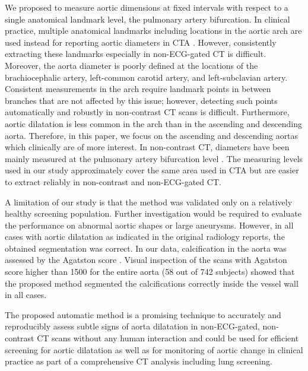 We proposed to measure aortic dimensions at fixed intervals with respect to a single anatomical landmark level, the pulmonary artery bifurcation. In clinical practice, multiple anatomical landmarks including locations in the aortic arch are used instead for reporting aortic diameters in CTA \autocite{american20102010, authors20142014, hager2002diameters}. However, consistently extracting these landmarks especially in non-ECG-gated CT is difficult. Moreover, the aorta diameter is poorly defined at the locations of the brachiocephalic artery, left-common carotid artery, and left-subclavian artery. Consistent measurements in the arch require landmark points in between branches that are not affected by this issue; however, detecting such points automatically and robustly in non-contrast CT scans is difficult. Furthermore, aortic dilatation is less common in the arch than in the ascending and descending aorta. Therefore, in this paper, we focus on the ascending and descending aortas which clinically are of more interest. In non-contrast CT, diameters have been mainly measured at the pulmonary artery bifurcation level \autocite{itani2002measurement, kalsch2013body, wolak2008aortic, mao2008normal, lin2008assessment}. The measuring levels used in our study approximately cover the same area used in CTA \autocite{american20102010, authors20142014, hager2002diameters} but are easier to extract reliably in non-contrast and non-ECG-gated CT.


A limitation of our study is that the method was validated only on a relatively healthy screening population. Further investigation would be required to evaluate the performance on abnormal aortic shapes or large aneurysms. However, in all cases with aortic dilatation as indicated in the original radiology reports, the obtained segmentation was correct. In our data, calcification in the aorta was assessed by the Agatston
score \autocite{rasmussen2013relationship}. Visual inspection of the scans with Agatston score higher than 1500 for the entire aorta (58 out of 742 subjects) showed that the proposed method segmented the calcifications correctly inside the vessel wall in all cases.


The proposed automatic method is a promising technique to accurately and reproducibly assess subtle signs of aorta dilatation in non-ECG-gated, non-contrast CT scans without any human interaction and could be used for efficient screening for aortic dilatation as well as for monitoring of aortic change in clinical practice as part of a comprehensive CT analysis including lung screening.


